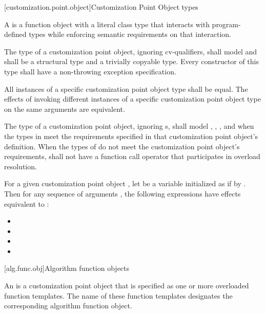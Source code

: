 [customization.point.object]{Customization Point Object types}

\pnum
A  is a function object
with a literal class type that interacts with program-defined types while
enforcing semantic requirements on that interaction.

\pnum
The type of a customization point object, ignoring cv-qualifiers, shall model
and shall be
a structural type and
a trivially copyable type.
Every constructor of this type
shall have a non-throwing exception specification.

\pnum
All instances of a specific customization point object type shall
be equal.
The effects of invoking different instances
of a specific customization point object type on the same arguments
are equivalent.

\pnum
The type  of a customization point object,
ignoring s, shall model
,
,
, and
when the types in  meet the requirements specified in that
customization point object's definition. When the types of  do
not meet the customization point object's requirements,  shall not have
a function call operator that participates in overload resolution.

\pnum
For a given customization point object ,
let  be a variable initialized as if by .
Then for any sequence of arguments ,
the following expressions have effects equivalent to :
\begin{itemize}
\item {}
\item {}
\item {}
\item {}
\end{itemize}

[alg.func.obj]{Algorithm function objects}

\pnum
An  is
a customization point object
that is specified as one or more overloaded function templates.
The name of these function templates designates
the corresponding algorithm function object.

